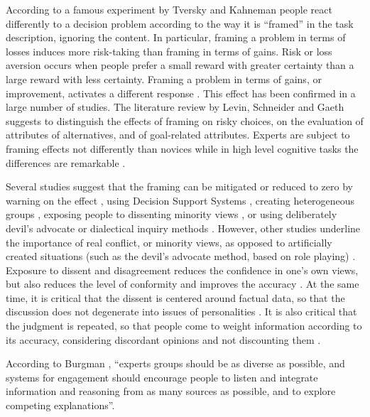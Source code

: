 \documentclass[b5paper,]{book}
\theoremstyle{definition}
\theoremstyle{definition}
\theoremstyle{definition}
\theoremstyle{remark}
\begin{document}
According to a famous experiment by Tversky and Kahneman
\citep{tversky1981framing} people react differently to a decision
problem according to the way it is ``framed'' in the task description,
ignoring the content. In particular, framing a problem in terms of
losses induces more risk-taking than framing in terms of gains. Risk or
loss aversion occurs when people prefer a small reward with greater
certainty than a large reward with less certainty. Framing a problem in
terms of gains, or improvement, activates a different response
\citep{tversky1981framing}. This effect has been confirmed in a large
number of studies. The literature review by Levin, Schneider and Gaeth
\citep{levin1998all} suggests to distinguish the effects of framing on
risky choices, on the evaluation of attributes of alternatives, and of
goal-related attributes. Experts are subject to framing effects not
differently than novices \citep{loke1992effects} while in high level
cognitive tasks the differences are remarkable \citep{larkin1980expert}.

Several studies suggest that the framing can be mitigated or reduced to
zero by warning on the effect \citep{cheng2010debiasing}, using Decision
Support Systems \citep{bhandari2008debiasing}, creating heterogeneous
groups \citep{yaniv2011group}, exposing people to dissenting minority
views \citep{nemeth1988modelling}, or using deliberately devil's
advocate or dialectical inquiry methods \citep{lord1984considering}.
However, other studies underline the importance of real conflict, or
minority views, as opposed to artificially created situations (such as
the devil's advocate method, based on role playing)
\citep{goodwin2010limits}. Exposure to dissent and disagreement reduces
the confidence in one's own views, but also reduces the level of
conformity and improves the accuracy \citep{nemeth2001devil}. At the
same time, it is critical that the dissent is centered around factual
data, so that the discussion does not degenerate into issues of
personalities \citep{keay2012authorising}. It is also critical that the
judgment is repeated, so that people come to weight information
according to its accuracy, considering discordant opinions and not
discounting them \citep{harries2004combining}.

According to Burgman \citep{burgman2015trusting}, ``experts groups
should be as diverse as possible, and systems for engagement should
encourage people to listen and integrate information and reasoning from
as many sources as possible, and to explore competing explanations''.
\end{document}
